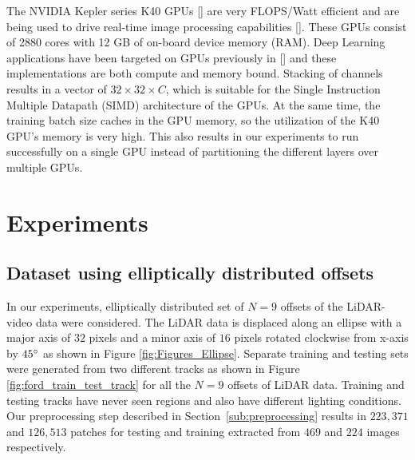 \documentclass{article}
\begin{document}
The NVIDIA Kepler series K40 GPUs [\cite{NVIDIA-Inc.2012NVIDIAs-Ne}] are very FLOPS/Watt efficient and are being used to drive real-time image processing capabilities [\cite{Venugopal2013Accelerati}]. These GPUs consist of 2880 cores with 12 GB of on-board device memory (RAM). Deep Learning applications have been targeted on GPUs previously in [\cite{Krizhevsky2012Imagenet-C}] and these implementations are both compute and memory bound. Stacking of channels results in a vector of $32 \times 32 \times \mathit{C}$, which is suitable for the Single Instruction Multiple Datapath (SIMD) architecture of the GPUs. At the same time, the training batch size caches in the GPU memory, so the utilization of the K40 GPU's memory is very high. This also results in our experiments to run successfully on a single GPU instead of partitioning the different layers over multiple GPUs.
 


\section{Experiments} %
\label{sec:experiments}

\subsection{Dataset using elliptically distributed offsets} %
\label{sub:dataset_using_elliptically_distributed_offsets}


In our experiments, elliptically distributed set of $N = 9$ offsets of the LiDAR-video data were considered. The LiDAR data is displaced along an ellipse with a major axis of $32$ pixels and a minor axis of $16$ pixels rotated clockwise from x-axis by $45\degree$ as shown in Figure \ref{fig:Figures_Ellipse}. Separate training and testing sets were generated from two different tracks as shown in Figure \ref{fig:ford_train_test_track} for all the $N = 9$ offsets of LiDAR data. Training and testing tracks have never seen regions and also have different lighting conditions. Our preprocessing step described in Section~\ref{sub:preprocessing} results in $223,371$ and $126,513$ patches for testing and training extracted from $469$ and $224$ images respectively.
\end{document}
